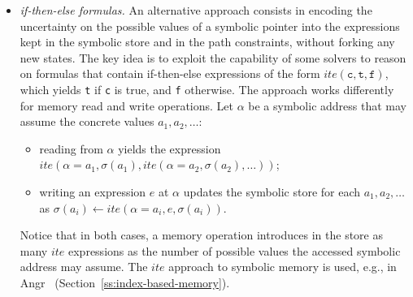 \begin{itemize}
\item {\em if-then-else formulas.} An alternative approach consists in encoding the uncertainty on the possible values of a symbolic pointer into the expressions kept in the symbolic store and in the path constraints, without forking any new states. The key idea is to exploit the capability of some solvers to reason on formulas that contain if-then-else expressions of the form $ite(\texttt{c}, \texttt{t}, \texttt{f})$, which yields \texttt{t} if \texttt{c} is true, and \texttt{f} otherwise.
The approach works differently for memory read and write operations. Let $\alpha$ be a symbolic address that may assume the concrete values $a_1, a_2, \ldots$:
\begin{itemize}
\item reading from $\alpha$ yields the expression $ite(\alpha=a_1,\sigma(a_1), ite(\alpha=a_2,\sigma(a_2), \ldots))$;
\item writing an expression $e$ at $\alpha$ updates the symbolic store for each $a_1, a_2, \ldots$ as $\sigma(a_i)\gets ite(\alpha=a_i,e,\sigma(a_i))$.
\end{itemize}
Notice that in both cases, a memory operation introduces in the store as many $ite$ expressions as the number of possible values the accessed symbolic address may assume. The $ite$ approach to symbolic memory is used, e.g., in {\sc Angr}~\cite{ANGR-SSP16} (Section~\ref{ss:index-based-memory}).


\end{itemize}
